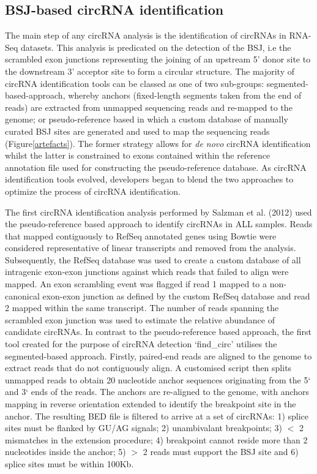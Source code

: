 \documentclass[journal,review,submit,pdftex,moreauthors]{Definitions/mdpi}
\begin{document}
\subsection{BSJ-based circRNA identification}
The main step of any circRNA analysis is the identification of circRNAs in RNA-Seq datasets. This analysis is predicated on the detection of the BSJ, i.e the scrambled exon junctions representing the joining of an upstream 5' donor site to the downstream 3' acceptor site to form a circular structure. The majority of circRNA identification tools can be classed as one of two sub-groups: segmented-based-approach, whereby anchors (fixed-length segments taken from the end of reads) are extracted from unmapped sequencing reads and re-mapped to the genome; or pseudo-reference based in which a custom database of manually curated BSJ sites are generated and used to map the sequencing reads (Figure\ref{artefacts}). The former strategy allows for \textit{de novo} circRNA identification whilst the latter is constrained to exons contained within the reference annotation file used for constructing the pseudo-reference database. As circRNA identification tools evolved, developers began to blend the two approaches to optimize the process of circRNA identification. \par
The first circRNA identification analysis performed by Salzman et al. (2012) \cite{Salzman2012} used the pseudo-reference based approach to identify circRNAs in ALL samples. Reads that mapped contiguously to RefSeq annotated genes using Bowtie were considered representative of linear transcripts and removed from the analysis. Subsequently, the RefSeq database was used to create a custom database of all intragenic exon-exon junctions against which reads that failed to align were mapped. An exon scrambling event was flagged if read 1 mapped to a non-canonical exon-exon junction as defined by the custom RefSeq database and read 2 mapped within the same transcript. The number of reads spanning the scrambled exon junction was used to estimate the relative abundance of candidate circRNAs. In contrast to the pseudo-reference based approach, the first tool created for the purpose of circRNA detection `find\_circ' \cite{find_circ} utilises the segmented-based approach. Firstly, paired-end reads are aligned to the genome to extract reads that do not contiguously align. A customised script then splits unmapped reads to obtain 20 nucleotide anchor sequences originating from the 5` and 3` ends of the reads. The anchors are re-aligned to the genome, with anchors mapping in reverse orientation extended to identify the breakpoint site in the anchor. The resulting BED file is filtered to arrive at a set of circRNAs: 1) splice sites must be flanked by GU/AG signals; 2) unambivalant breakpoints; 3) $<$ 2 mismatches in the extension procedure; 4) breakpoint cannot reside more than 2 nucleotides inside the anchor; 5) $>$ 2 reads must support the BSJ site and 6) splice sites must be within 100Kb. \par
\end{document}
